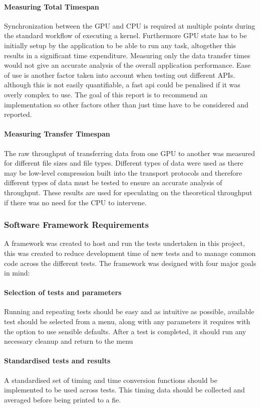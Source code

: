 \documentclass[12pt,a4paper]{article}
\begin{document}
\paragraph{Measuring Total Timespan}
Synchronization between the GPU and CPU is required at multiple points during the standard workflow of executing a kernel. Furthermore GPU state has to be initially setup by the application to be able to run any task, altogether this results in a significant time expenditure.  Measuring only the data transfer times would not give an accurate analysis of the overall application performance. 
Ease of use is another factor taken into account when testing out different APIs. although this is not easily quantifiable, a fast api could be penalised if it was overly complex to use. The goal of this report is to recommend an implementation so other factors other than just time have to be considered and reported.
\paragraph{Measuring Transfer Timespan}
The raw throughput of transferring data from one GPU to another was measured for different file sizes and file types. Different types of data were used as there may be low-level compression built into the transport protocols and therefore different types of data must be tested to ensure an accurate analysis of throughput. These results are used for speculating on the theoretical throughput if there was no need for the CPU to intervene.
\subsubsection{Software Framework Requirements}
A framework was created to host and run the tests undertaken in this project, this was created to reduce development time of new tests and to manage common code across the different tests. The framework was designed with four major goals in mind:

\paragraph{Selection of tests and parameters}
Running and repeating tests should be easy and as intuitive as possible, available test should be selected from a menu, along with any parameters it requires with the option to use sensible defaults. After a test is completed, it should run any necessary cleanup and return to the menu
\paragraph{Standardised tests and results}
A standardised set of timing and time conversion functions should be  implemented to be used across tests. This timing data should be collected and averaged before being printed to a fie.
\end{document}
